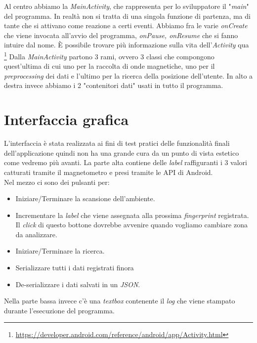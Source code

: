 Al centro abbiamo la \textit{MainActivity}, che rappresenta per lo sviluppatore il "\textit{main}" del programma. In realt\`a non si tratta di una singola funzione di partenza, ma di tante che si attivano come reazione a certi eventi. Abbiamo fra le varie \textit{onCreate} che viene invocata all'avvio del programma, \textit{onPause, onResume} che si fanno intuire dal nome. \`E possibile trovare pi\`u informazione sulla vita dell'\textit{Activity} qua \footnote{\url{https://developer.android.com/reference/android/app/Activity.html}}
Dalla \textit{MainActivity} partono 3 rami, ovvero 3 classi che compongono quest'ultima di cui uno per la raccolta di onde magnetiche, uno per il \textit{preprocessing} dei dati e l'ultimo per la ricerca della posizione dell'utente. In alto a destra invece abbiamo i 2 "contenitori dati" usati in tutto il programma.

\section{Interfaccia grafica}
L'interfaccia \`e stata realizzata ai fini di test pratici delle funzionalit\`a finali dell'applicazione quindi non ha una grande cura da un punto di vista estetico come vedremo pi\`u  avanti.
La parte alta contiene delle \textit{label} raffiguranti i 3 valori catturati tramite il magnetometro e presi tramite le API di Android. \\
Nel mezzo ci sono dei pulsanti per:
\begin{itemize}
	\item Iniziare/Terminare la scansione dell'ambiente.
	\item Incrementare la \textit{label} che viene assegnata alla prossima \textit{fingerprint} registrata. Il \textit{click} di questo bottone dovrebbe avvenire quando vogliamo cambiare zona da analizzare.
	\item Iniziare/Terminare la ricerca.
	\item Serializzare tutti i dati registrati finora
	\item De-serializzare i dati salvati in un \textit{JSON}.
\end{itemize}
Nella parte bassa invece c'\`e una \textit{textbox} contenente il \textit{log} che viene stampato durante l'esecuzione del programma.

